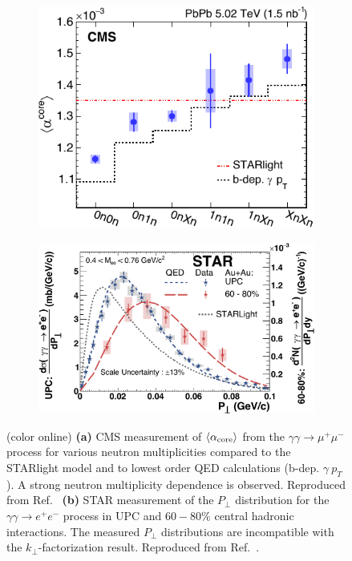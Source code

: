 \documentclass[12pt,epjc3]{svjour3}\sloppy
\begin{document}
\begin{figure}
    \centering
    \begin{subfigure}{.43\textwidth}
      \centering
      \includegraphics[width=.99\linewidth]{fig/fig_1-crop.pdf}
      \caption{}
    \end{subfigure}%
    \begin{subfigure}{.57\textwidth}
      \centering
      \includegraphics[width=.99\linewidth]{fig/fig_2-crop.pdf}
      \caption{}
    \end{subfigure}
 
    \caption{ (color online) \textbf{(a)} CMS measurement of $\langle \alpha_{\rm core} \rangle$ from the $\gamma\gamma \rightarrow \mu^+\mu^-$ process for various neutron multiplicities compared to the STARlight model and to lowest order QED calculations (b-dep. $\gamma\ p_T$). A strong neutron multiplicity dependence is observed. Reproduced from Ref.~\cite{cmscollaborationObservationForwardNeutron2020a}
    \textbf{(b)} STAR measurement of the $P_\perp$ distribution for the $\gamma\gamma \rightarrow e^+e^-$ process in UPC and $60-80\%$ central hadronic interactions. The measured $P_\perp$ distributions are incompatible with the $k_\perp$-factorization result. Reproduced from Ref.~\cite{starcollaborationMeasurementMomentumAngular2021}.
    }
    \label{fig:exp_impact}
\end{figure}
\end{document}

